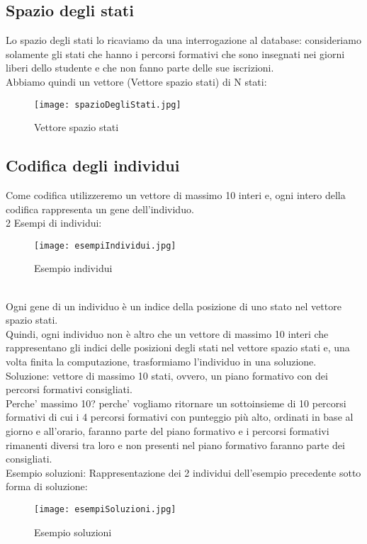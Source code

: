 \documentclass[10pt,a4paper]{article}
\begin{document}
    \subsection{Spazio degli stati}
      \label{spazioDegliStatiSubsection}
      Lo spazio degli stati lo ricaviamo da una interrogazione al database: consideriamo solamente gli stati che hanno i percorsi formativi 
      che sono insegnati nei giorni liberi dello studente e che non fanno parte delle sue iscrizioni.\\
      Abbiamo quindi un vettore (Vettore spazio stati) di N stati:\\
      \begin{figure}[h!]
        \centering
        \caption{Vettore spazio stati}
        \texttt{[image: spazioDegliStati.jpg]}
        \label{vettoreStati}
      \end{figure}
      
      \newpage
      
    \subsection{Codifica degli individui}
      \label{codificaDegliIndividuiSubsection}
      Come codifica utilizzeremo un vettore di massimo 10 interi e, ogni intero della codifica rappresenta un gene dell'individuo.\\
      2 Esempi di individui:
      \begin{figure}[h!]
        \centering
        \caption{Esempio individui}
        \texttt{[image: esempiIndividui.jpg]}
        \label{esempioIndividui}
      \end{figure}\\
      Ogni gene di un individuo è un indice della posizione di uno stato nel vettore spazio stati.\\
      Quindi, ogni individuo non è altro che un vettore di massimo 10 interi che rappresentano gli indici delle posizioni degli stati 
      nel vettore spazio stati e, una volta finita la computazione, trasformiamo l'individuo in una soluzione.\\
      Soluzione: vettore di massimo 10 stati, ovvero, un piano formativo con dei percorsi formativi consigliati.\\ 
      Perche' massimo 10? perche' vogliamo ritornare un sottoinsieme di 10 percorsi formativi di cui i  4 percorsi formativi con punteggio più alto, 
      ordinati in base al giorno e all'orario, faranno parte del piano formativo e i percorsi formativi rimanenti diversi tra loro e non presenti 
      nel piano formativo faranno parte dei consigliati.\\
      Esempio soluzioni:
      Rappresentazione dei 2 individui dell'esempio precedente sotto forma di soluzione:\\
      \begin{figure}[h!]
        \centering
        \caption{Esempio soluzioni}
        \texttt{[image: esempiSoluzioni.jpg]}
        \label{esempiSoluzioni}
      \end{figure}\\
      
\end{document}
